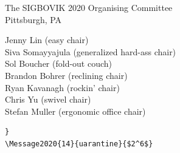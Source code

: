 \documentclass[12pt]{article}
\begin{document}
\begin{flushright}
The SIGBOVIK 2020 Organising Committee\\
Pittsburgh, PA

Jenny Lin (easy chair)\\
Siva Somayyajula (generalized hard-ass chair)\\
Sol Boucher (fold-out couch)\\
Brandon Bohrer (reclining chair)\\
Ryan Kavanagh (rockin' chair)\\
Chris Yu (swivel chair)\\
Stefan Muller (ergonomic office chair)
\end{flushright}
\begin{verbatim}
}
\Message2020{14}{uarantine}{$2^6$}
\end{verbatim}



\thispagestyle{empty}
\end{document}
